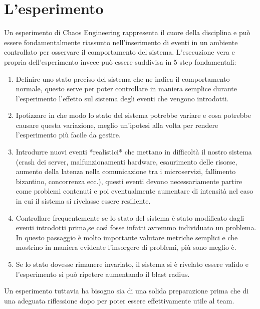 \section{L'esperimento}

Un esperimento di Chaos Engineering rappresenta il cuore della disciplina e può essere fondamentalmente riassunto nell'inserimento di eventi in un ambiente controllato per osservare il comportamento del sistema.
L'esecuzione vera e propria dell'esperimento invece può essere suddivisa in 5 step fondamentali:
\begin{enumerate}
    \item Definire uno stato preciso del sistema che ne indica il comportamento normale, questo serve per poter controllare in maniera semplice durante l'esperimento l'effetto sul sistema degli eventi che vengono introdotti.
    \item Ipotizzare in che modo lo stato del sistema potrebbe variare e cosa potrebbe causare questa variazione, meglio un'ipotesi alla volta per rendere l'esperimento più facile da gestire.
    \item Introdurre nuovi eventi *realistici* che mettano in difficoltà il nostro sistema (crash dei server, malfunzionamenti hardware, esaurimento delle risorse, aumento della latenza nella comunicazione tra i microservizi, fallimento bizantino, concorrenza ecc.), questi eventi devono necessariamente partire come problemi contenuti e poi eventualmente aumentare di intensità nel caso in cui il sistema si rivelasse essere resiliente.
    \item Controllare frequentemente se lo stato del sistema è stato modificato dagli eventi introdotti prima,se così fosse infatti avremmo individuato un problema. In questo passaggio è molto importante valutare metriche semplici e che mostrino in maniera evidente l'insorgere di problemi, più sono meglio è.
    \item Se lo stato dovesse rimanere invariato, il sistema si è rivelato essere valido e l'esperimento si può ripetere aumentando il \gls{blast radius}.
\end{enumerate}
Un esperimento tuttavia ha bisogno sia di una solida preparazione prima che di una adeguata riflessione dopo per poter essere effettivamente utile al team.

